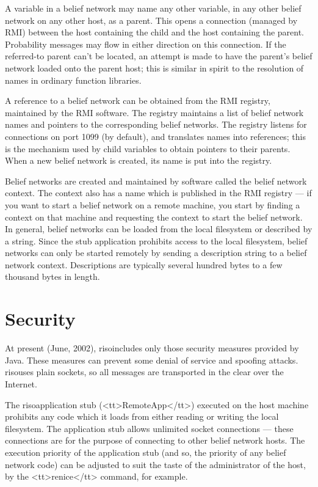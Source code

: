 \documentclass[12pt]{article}
\newcommand{\RISO}{{\sc riso}}
\begin{document}
A variable in a belief network may name any other variable, in any other
belief network on any other host, as a parent.
This opens a connection (managed by RMI) between the host containing the child
and the host containing the parent. Probability messages may flow in either
direction on this connection.
If the referred-to parent can't be located, an attempt is made to have 
the parent's belief network loaded onto the parent host;
this is similar in spirit to the resolution of names in ordinary function libraries.

A reference to a belief network can be obtained from the RMI registry,
maintained by the RMI software.
The registry maintains a list of belief network names and pointers to the
corresponding belief networks.
The registry listens for connections on port 1099 (by default), and 
translates names into references;
this is the mechanism used by child variables to obtain pointers to their parents.
When a new belief network is created,
its name is put into the registry.

Belief networks are created and maintained by software called the 
belief network context. 
The context also has a name which is published in the RMI registry --- if you
want to start a belief network on a remote machine, you start by finding a 
context on that machine and requesting the context to start the belief network.
In general, belief networks can be loaded from the local filesystem or described
by a string.
Since the stub application prohibits access to the local filesystem,
belief networks can only be started remotely by sending a description string
to a belief network context.
Descriptions are typically several hundred bytes to a few thousand bytes in length.

\section{Security}
At present (June, 2002), \RISO includes only those security measures
provided by Java. 
These measures can prevent some denial of service and spoofing attacks.
\RISO uses plain sockets, so all messages are transported in
the clear over the Internet.

The \RISO application stub (<tt>RemoteApp</tt>) executed on the
host machine prohibits any code which it loads from either reading
or writing the local filesystem.
The application stub allows unlimited socket connections --- these
connections are for the purpose of connecting to other belief network hosts.
The execution priority of the application stub (and so, the priority of
any belief network code) can be adjusted to suit the taste of the
administrator of the host, by the <tt>renice</tt> command, for example.
\end{document}
